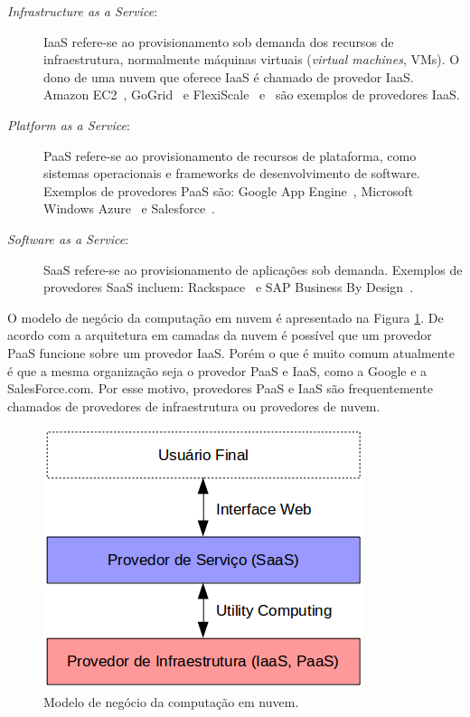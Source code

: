 \begin{description}

\item[\textit{Infrastructure as a Service}:] IaaS refere-se ao provisionamento sob demanda dos recursos de infraestrutura, normalmente máquinas virtuais (\textit{virtual machines}, VMs). O dono de uma nuvem que oferece IaaS é chamado de provedor IaaS. Amazon EC2~\cite{AmazonEC2:Online}, GoGrid~\cite{GoGrid:Online} e FlexiScale~\citep{Aguiar:2005} e~\cite{FlexiScale:Online} são exemplos de provedores IaaS.

\item [\textit{Platform as a Service}:] PaaS refere-se ao provisionamento de recursos de plataforma, como sistemas operacionais e frameworks de desenvolvimento de software. Exemplos de provedores PaaS são: Google App Engine~\cite{GoogleAppEngine:Online}, Microsoft Windows Azure~\cite{MicrosoftAzure:Online} e Salesforce~\cite{Salesforce:Online}.

\item[\textit{Software as a Service}:] SaaS refere-se ao provisionamento de aplicações sob demanda. Exemplos de provedores SaaS incluem: Rackspace~\cite{Rackspace:Online} e SAP Business By Design~\cite{SAP:Online}.

\end{description}

O modelo de negócio da computação em nuvem é apresentado na Figura \ref{business-model}. De acordo com a arquitetura em camadas da nuvem é possível que um provedor PaaS funcione sobre um provedor IaaS. Porém o que é muito comum atualmente é que a mesma organização seja o provedor PaaS e IaaS, como a Google e a SalesForce.com. Por esse motivo, provedores PaaS e IaaS são frequentemente chamados de provedores de infraestrutura ou provedores de nuvem.

\begin{figure}[htbp]
  \centering \includegraphics[scale=.6]{imgs/business-model.png}
\caption{Modelo de negócio da computação em nuvem.} 
\label{business-model}
\end{figure}


